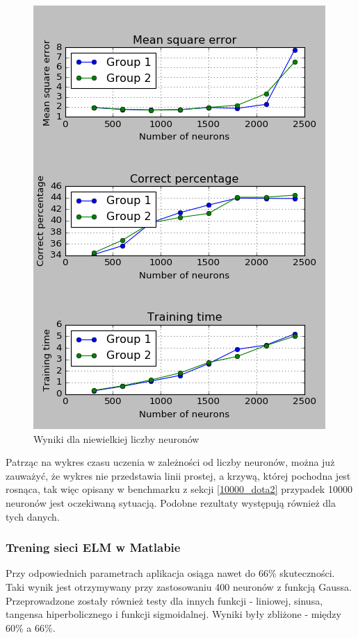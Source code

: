 \documentclass{article}
\begin{document}
\begin{figure}[H]
\centering
\includegraphics[width=\textwidth]{wyniki_forest_python.png}
\caption{Wyniki dla niewielkiej liczby neuronów}
\label{forest_python}
\end{figure}
Patrząc na wykres czasu uczenia w zależności od liczby neuronów, można już zauważyć, że wykres nie przedstawia linii prostej, a krzywą, której pochodna jest rosnąca, tak więc opisany w benchmarku z sekcji \ref{10000_dota2} przypadek 10000 neuronów jest oczekiwaną sytuacją. Podobne rezultaty występują również dla tych danych.
\subsubsection{Trening sieci ELM w Matlabie}
Przy odpowiednich parametrach aplikacja osiąga nawet do 66\% skuteczności. 
Taki wynik jest otrzymywany przy zastosowaniu 400 neuronów z funkcją Gaussa.
Przeprowadzone zostały również testy dla innych funkcji - liniowej, sinusa, tangensa hiperbolicznego i funkcji sigmoidalnej.
Wyniki były zbliżone - między 60\% a 66\%.
\end{document}
